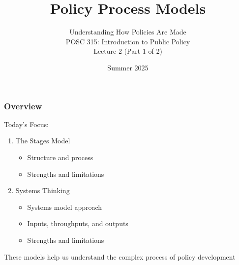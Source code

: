 \documentclass[10pt]{beamer}
\begin{document}
\title{Policy Process Models}
\subtitle{Understanding How Policies Are Made\\POSC 315: Introduction to Public Policy\\Lecture 2 (Part 1 of 2)}
\date{Summer 2025}

\maketitle

\begin{frame}
\frametitle{Overview}

\begin{block}{Today's Focus:}
\begin{enumerate}
\item The Stages Model
\begin{itemize}
\item Structure and process
\item Strengths and limitations
\end{itemize}
\item Systems Thinking
\begin{itemize}
\item Systems model approach
\item Inputs, throughputs, and outputs
\item Strengths and limitations
\end{itemize}
\end{enumerate}
\end{block}

\pause
\vspace{0.5cm}
\centering
These models help us understand the complex process of policy development

\end{frame}
\end{document}
